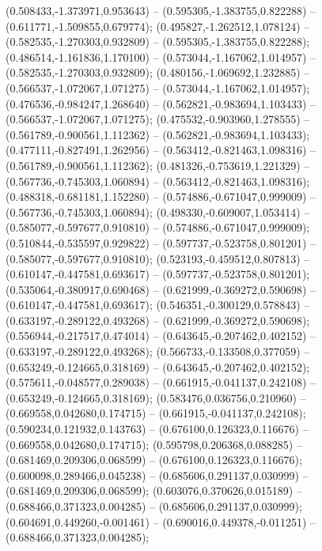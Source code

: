  (0.508433,-1.373971,0.953643) -- (0.595305,-1.383755,0.822288) -- (0.611771,-1.509855,0.679774);
 (0.495827,-1.262512,1.078124) -- (0.582535,-1.270303,0.932809) -- (0.595305,-1.383755,0.822288);
 (0.486514,-1.161836,1.170100) -- (0.573044,-1.167062,1.014957) -- (0.582535,-1.270303,0.932809);
 (0.480156,-1.069692,1.232885) -- (0.566537,-1.072067,1.071275) -- (0.573044,-1.167062,1.014957);
 (0.476536,-0.984247,1.268640) -- (0.562821,-0.983694,1.103433) -- (0.566537,-1.072067,1.071275);
 (0.475532,-0.903960,1.278555) -- (0.561789,-0.900561,1.112362) -- (0.562821,-0.983694,1.103433);
 (0.477111,-0.827491,1.262956) -- (0.563412,-0.821463,1.098316) -- (0.561789,-0.900561,1.112362);
 (0.481326,-0.753619,1.221329) -- (0.567736,-0.745303,1.060894) -- (0.563412,-0.821463,1.098316);
 (0.488318,-0.681181,1.152280) -- (0.574886,-0.671047,0.999009) -- (0.567736,-0.745303,1.060894);
 (0.498330,-0.609007,1.053414) -- (0.585077,-0.597677,0.910810) -- (0.574886,-0.671047,0.999009);
 (0.510844,-0.535597,0.929822) -- (0.597737,-0.523758,0.801201) -- (0.585077,-0.597677,0.910810);
 (0.523193,-0.459512,0.807813) -- (0.610147,-0.447581,0.693617) -- (0.597737,-0.523758,0.801201);
 (0.535064,-0.380917,0.690468) -- (0.621999,-0.369272,0.590698) -- (0.610147,-0.447581,0.693617);
 (0.546351,-0.300129,0.578843) -- (0.633197,-0.289122,0.493268) -- (0.621999,-0.369272,0.590698);
 (0.556944,-0.217517,0.474014) -- (0.643645,-0.207462,0.402152) -- (0.633197,-0.289122,0.493268);
 (0.566733,-0.133508,0.377059) -- (0.653249,-0.124665,0.318169) -- (0.643645,-0.207462,0.402152);
 (0.575611,-0.048577,0.289038) -- (0.661915,-0.041137,0.242108) -- (0.653249,-0.124665,0.318169);
 (0.583476,0.036756,0.210960) -- (0.669558,0.042680,0.174715) -- (0.661915,-0.041137,0.242108);
 (0.590234,0.121932,0.143763) -- (0.676100,0.126323,0.116676) -- (0.669558,0.042680,0.174715);
 (0.595798,0.206368,0.088285) -- (0.681469,0.209306,0.068599) -- (0.676100,0.126323,0.116676);
 (0.600098,0.289466,0.045238) -- (0.685606,0.291137,0.030999) -- (0.681469,0.209306,0.068599);
 (0.603076,0.370626,0.015189) -- (0.688466,0.371323,0.004285) -- (0.685606,0.291137,0.030999);
 (0.604691,0.449260,-0.001461) -- (0.690016,0.449378,-0.011251) -- (0.688466,0.371323,0.004285);
